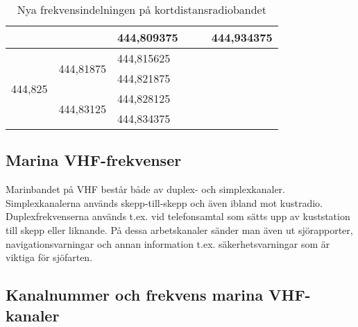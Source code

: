 \begin{table}[h]
\begin{tabular}{|l|l|l|l|l|l|}
		                                               &                                                 & 444,809375                      & \multicolumn{1}{l|}{}                         & \multicolumn{1}{l|}{}                           & \multicolumn{1}{l|}{444,934375} \\ \hline
		\multirow{4}{*}{444,825}                       & \multirow{2}{*}{444,81875}                      & 444,815625                      & \multicolumn{3}{l}{\multirow{4}{*}{}}                                                                                             \\ \cline{3-3}
		                                               &                                                 & 444,821875                      & \multicolumn{3}{l}{}                                                                                                              \\ \cline{2-3}
		                                               & \multirow{2}{*}{444,83125}                      & 444,828125                      & \multicolumn{3}{l}{}                                                                                                              \\ \cline{3-3}
		                                               &                                                 & 444,834375                      & \multicolumn{3}{l}{}                                                                                                              \\ \cline{1-3}
	\end{tabular}
\caption{Nya frekvensindelningen på kortdistansradiobandet}
\label{tab:SRBR-frekvenser}
\end{table}

\clearpage

\subsection{Marina VHF-frekvenser}

Marinbandet på VHF består både av duplex- och simplexkanaler. Simplexkanalerna
används skepp-till-skepp och även ibland mot kustradio. Duplexfrekvenserna
används t.ex. vid telefonsamtal som sätts upp av kuststation till skepp eller
liknande. På dessa arbetskanaler sänder man även ut sjörapporter,
navigationsvarningar och annan information t.ex. säkerhetsvarningar som är
viktiga för sjöfarten.

\subsection{Kanalnummer och frekvens marina VHF-kanaler}

